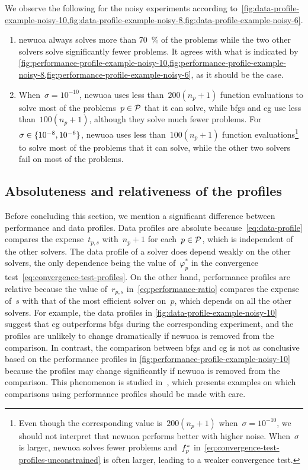 We observe the following for the noisy experiments according to~\cref{fig:data-profile-example-noisy-10,fig:data-profile-example-noisy-8,fig:data-profile-example-noisy-6}.
\begin{enumerate}
    \item \Gls{newuoa} always solves more than \SI{70}{\percent} of the problems while the two other solvers solve significantly fewer problems.
    It agrees with what is indicated by \cref{fig:performance-profile-example-noisy-10,fig:performance-profile-example-noisy-8,fig:performance-profile-example-noisy-6}, as it should be the case.
    \item When~$\sigma = 10^{-10}$, \gls{newuoa} uses less than~$200 (n_p + 1)$ function evaluations to solve most of the problems~$p \in \mathcal{P}$ that it can solve, while \gls{bfgs} and \gls{cg} use less than~$100 (n_p + 1)$, although they solve much fewer problems.
    For~$\sigma \in \{10^{-8}, 10^{-6}\}$, \gls{newuoa} uses less than~$100 (n_p + 1)$ function evaluations\footnote{Even though the corresponding value is~$200 (n_p + 1)$ when~$\sigma = 10^{-10}$, we should not interpret that \gls{newuoa} performs better with higher noise. When~$\sigma$ is larger, \gls{newuoa} solves fewer problems and~$f_p^{\ast}$ in~\cref{eq:convergence-test-profiles-unconstrained} is often larger, leading to a weaker convergence test.} to solve most of the problems that it can solve, while the other two solvers fail on most of the problems.
\end{enumerate}

\subsection{Absoluteness and relativeness of the profiles}

Before concluding this section, we mention a significant difference between performance and data profiles.
Data profiles are absolute because~\cref{eq:data-profile} compares the expense~$t_{p, s}$ with~$n_p + 1$ for each~$p \in \mathcal{P}$, which is independent of the other solvers.
The data profile of a solver does depend weakly on the other solvers, the only dependence being the value of~$\varphi_p^{\ast}$ in the convergence test~\cref{eq:convergence-test-profiles}.
On the other hand, performance profiles are relative because the value of~$r_{p, s}$ in~\cref{eq:performance-ratio} compares the expense of~$s$ with that of the most efficient solver on~$p$, which depends on all the other solvers. 
For example, the data profiles in \cref{fig:data-profile-example-noisy-10} suggest that \gls{cg} outperforms \gls{bfgs} during the corresponding experiment, and the profiles are unlikely to change dramatically if \gls{newuoa} is removed from the comparison.
In contrast, the comparison between \gls{bfgs} and \gls{cg} is not as conclusive based on the performance profiles in \cref{fig:performance-profile-example-noisy-10} because the profiles may change significantly if \gls{newuoa} is removed from the comparison.
This phenomenon is studied in~\cite{Gould_Scott_2016}, which presents examples on which comparisons using performance profiles should be made with care.

